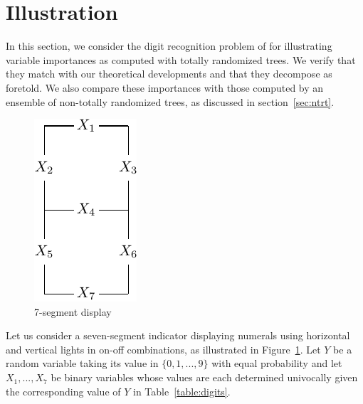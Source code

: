 \section{Illustration}
\label{sec:6:illustration}

In this section, we consider the digit recognition
problem of \citep{breiman:1984} for illustrating variable importances as
computed with totally randomized trees. We verify that they match with our
theoretical developments and that they decompose as foretold. We also compare
these importances with those computed by an ensemble of non-totally randomized
trees, as discussed in section~\ref{sec:ntrt}.%

\begin{figure}
    \centering
    \includegraphics[]{figures/ch6_led.pdf}
    \caption{7-segment display}
    \label{fig:digits}
\end{figure}

Let us consider a seven-segment indicator displaying numerals using horizontal and
vertical lights in on-off combinations, as illustrated in
Figure~\ref{fig:digits}. Let $Y$ be a random variable taking its value in $\{0, 1,
..., 9\}$ with equal probability and  let $X_1, ..., X_7$ be binary variables
whose values are each determined univocally given the corresponding value of $Y$
in Table~\ref{table:digits}.

